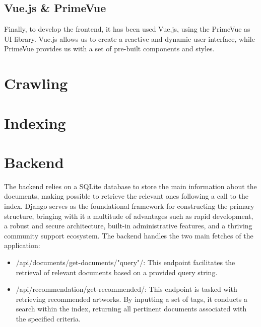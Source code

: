 \documentclass[12pt]{spieman}  %
\begin{document}
\begin{spacing}{1}
    \subsection{Vue.js \& PrimeVue}
    Finally, to develop the frontend, it has been used Vue.js, using the PrimeVue as UI library. Vue.js allows us to create a reactive and dynamic user interface, while PrimeVue provides us with a set of pre-built components and styles.

    \section{Crawling}\label{sec:crawling}
    \section{Indexing}\label{sec:indexing}

    \section{Backend}
    The backend relies on a SQLite database to store the main information about the documents, making possible to retrieve the relevant ones following a call to the index.\newline
    Django serves as the foundational framework for constructing the primary structure, bringing with it a multitude of advantages such as rapid development, a robust and secure architecture, built-in administrative features, and a thriving community support ecosystem.\newline
    The backend handles the two main fetches of the application:
    \begin{itemize}
        \item /api/documents/get-documents/"query"/: This endpoint facilitates the retrieval of relevant documents based on a provided query string.
        \item /api/recommendation/get-recommended/: This endpoint is tasked with retrieving recommended artworks. By inputting a set of tags, it conducts a search within the index, returning all pertinent documents associated with the specified criteria.
    \end{itemize}


\end{spacing}
\end{document}
